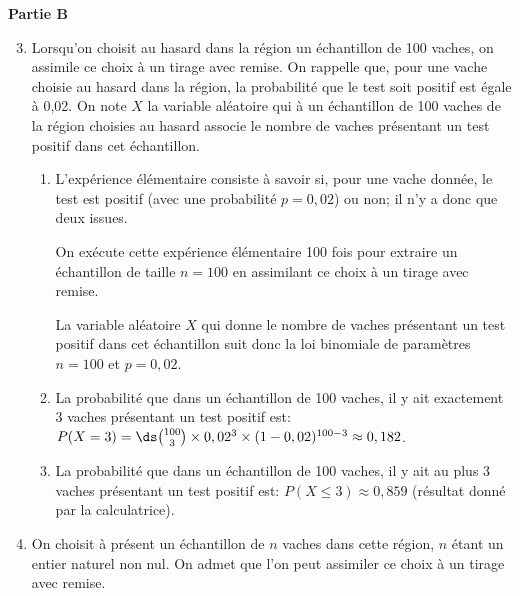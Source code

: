 \medskip

\textbf{Partie B}


\begin{enumerate}
\setcounter{enumi}{2}
	\item Lorsqu'on choisit au hasard dans la région un échantillon de 100 vaches, on assimile ce choix à un tirage avec remise.	
On rappelle que, pour une vache choisie au hasard dans la région, la probabilité que le test soit positif est égale à 0,02.
On note $X$ la variable aléatoire qui à un échantillon de 100 vaches de la région choisies au hasard associe le nombre de vaches présentant un test positif dans cet échantillon.

	\begin{enumerate}
		\item %
L'expérience élémentaire consiste à savoir si, pour une vache donnée, le test est positif (avec une probabilité $p=0,02$) ou non; il n'y a donc que deux issues.

On exécute cette expérience élémentaire 100 fois pour extraire un échantillon de taille $n=100$ en assimilant ce choix à un tirage avec remise.

La variable aléatoire $X$ qui donne  le nombre de vaches présentant un test positif dans cet échantillon suit donc la loi binomiale de paramètres $n=100$ et $p=0,02$.

		\item La probabilité que dans un échantillon de 100 vaches, il y ait exactement 3 vaches présentant un test positif est:	
$P(X=3) = \ds\binom{100}{3}\times 0,02^{3}\times (1-0,02)^{100-3}
\approx 0,182$.
				

		\item La probabilité que dans un échantillon de 100 vaches, il y ait au plus 3 vaches présentant un test positif est:		
$P(X\leqslant 3)\approx 0,859$ (résultat donné par la calculatrice).		
		


	\end{enumerate}

	\item On choisit à présent un échantillon de $n$ vaches dans cette région, $n$ étant un entier naturel non nul. On admet que l'on peut assimiler ce choix à un tirage avec remise.


\end{enumerate}

